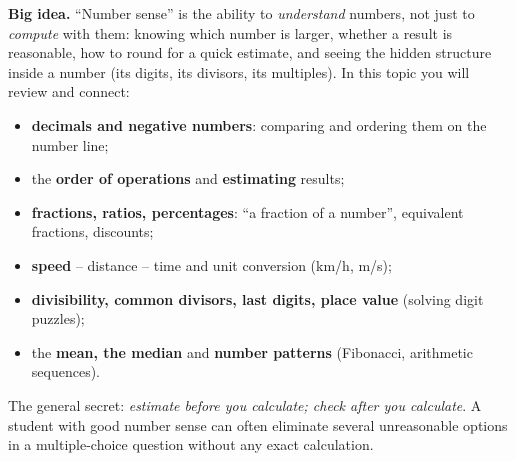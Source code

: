 \begin{knowbox}
\textbf{Big idea.} ``Number sense'' is the ability to \emph{understand} numbers, not just to \emph{compute} with them:
knowing which number is larger, whether a result is reasonable, how to round for a quick estimate, and seeing the
hidden structure inside a number (its digits, its divisors, its multiples). In this topic you will review and connect:
\begin{itemize}[leftmargin=1.4em,itemsep=1pt,topsep=2pt]
  \item \textbf{decimals and negative numbers}: comparing and ordering them on the number line;
  \item the \textbf{order of operations} and \textbf{estimating} results;
  \item \textbf{fractions, ratios, percentages}: ``a fraction of a number'', equivalent fractions, discounts;
  \item \textbf{speed} -- distance -- time and unit conversion (km/h, m/s);
  \item \textbf{divisibility, common divisors, last digits, place value} (solving digit puzzles);
  \item the \textbf{mean, the median} and \textbf{number patterns} (Fibonacci, arithmetic sequences).
\end{itemize}
The general secret: \emph{estimate before you calculate; check after you calculate}. A student with good number
sense can often eliminate several unreasonable options in a multiple-choice question without any exact calculation.
\end{knowbox}
\vspace{0.3cm}

